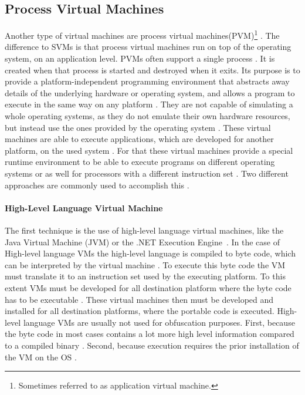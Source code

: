 \documentclass[10pt,twoside,a4paper,bibliography=totoc]{scrbook}
\begin{document}
\subsection{Process Virtual Machines}
\label{sec2:procvm}
Another type of virtual machines are process virtual machines(PVM)\footnote{Sometimes referred to as application virtual machine.} \cite{virtbo}.
The difference to SVMs is that process virtual machines run on top of the operating system, on an application level.
PVMs often support a single process \cite{craig2006virtual}. It is created when that process is started and destroyed when it exits. 
Its purpose is to provide a platform-independent programming environment that abstracts away details of the underlying hardware or operating system, and allows a program to execute in the same way on any platform \cite{craig2006virtual}. 
They are not capable of simulating a whole operating systems, as they do not emulate their own hardware resources, but instead use the ones provided by the operating system \cite{craig2006virtual}.
These virtual machines are able to execute applications, which are developed for another platform, on the used system \cite{virtbo}.
For that these virtual machines provide a special runtime environment to be able to execute programs on different operating systems or as well for processors with a different instruction set \cite{virtbo}.
Two different approaches are commonly used to accomplish this \cite{virtbo}.

\paragraph*{High-Level Language Virtual Machine}
The first technique is the use of high-level language virtual machines, like the Java Virtual Machine (JVM) or the .NET Execution Engine~\cite{compvirt}.
In the case of High-level language VMs the high-level language is compiled to byte code, which can be interpreted by the virtual machine \cite{craig2006virtual}.
To execute this byte code the VM must translate it to an instruction set used by the executing platform. To this extent VMs must be developed for all destination platform where the byte code has to be executable \cite{craig2006virtual}.
These virtual machines then must be developed and installed for all destination platforms, where the portable code is executed.
High-level language VMs are usually not used for obfuscation purposes. First, because the byte code in most cases contains a lot more high level information compared to a compiled binary \cite{eilam}. Second, because execution requires the prior installation of the VM on the OS \cite{craig2006virtual}.
\end{document}
